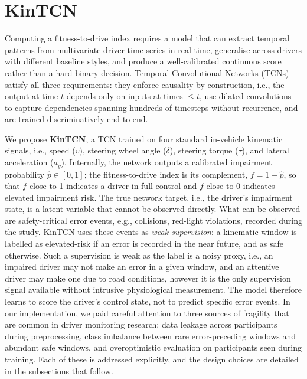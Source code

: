 \section{KinTCN}
\label{sec:method}

Computing a fitness-to-drive index requires a model that can extract
temporal patterns from multivariate driver time series in real time,
generalise across drivers with different baseline styles, and produce a
well-calibrated continuous score rather than a hard binary decision.
Temporal Convolutional Networks (TCNs)~\cite{Bai2018} satisfy all three
requirements: they enforce causality by construction, i.e., the output at time $t$
depends only on inputs at times $\leq t$, use dilated convolutions~\cite{vandenOord2016}
to capture dependencies spanning hundreds of timesteps without recurrence,
and are trained discriminatively end-to-end.

We propose \textbf{KinTCN}, a TCN trained on four standard in-vehicle kinematic
signals, i.e., speed ($v$), steering wheel angle ($\delta$), steering torque ($\tau$),
and lateral acceleration ($a_y$).
Internally, the network outputs a calibrated impairment probability
$\hat{p} \in [0,1]$; the fitness-to-drive index is its complement,
$f = 1 - \hat{p}$, so that $f$ close to 1 indicates a driver in full control
and $f$ close to 0 indicates elevated impairment risk.
The true network target, i.e., the driver's impairment state, is a latent variable that
cannot be observed directly. What can be observed are safety-critical error events, e.g., collisions, red-light
violations, recorded during the study.
KinTCN uses these events as \emph{weak supervision}: a kinematic window is
labelled as elevated-risk if an error is recorded in the near future, and as
safe otherwise. Such a supervision is weak as the label is a noisy proxy, i.e., an impaired driver may not
make an error in a given window, and an attentive driver may make one due to
road conditions, however it is the only supervision signal available without
intrusive physiological measurement.
The model therefore learns to score the driver's control state, not to predict
specific error events.
In our implementation, we paid careful attention to three sources of fragility that are common in
driver monitoring research: data leakage across participants during preprocessing,
class imbalance between rare error-preceding windows and abundant safe windows,
and overoptimistic evaluation on participants seen during training.
Each of these is addressed explicitly, and the design choices are detailed in
the subsections that follow.

